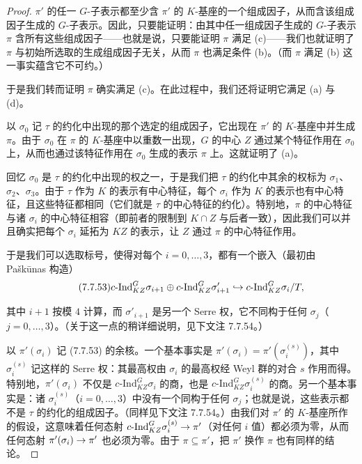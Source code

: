 \begin{proof}
$\pi'$ 的任一 $G$-子表示都至少含 $\pi'$ 的 $K$-基座的一个组成因子，从而含该组成因子生成的 $G$-子表示。因此，只要能证明：由其中任一组成因子生成的 $G$-子表示 $\pi$ 含所有这些组成因子——也就是说，只要能证明 $\pi$ 满足 (c)——我们也就证明了 $\pi$ 与初始所选取的生成组成因子无关，从而 $\pi$ 也满足条件 (b)。（而 $\pi$ 满足 (b) 这一事实蕴含它不可约。）

于是我们转而证明 $\pi$ 确实满足 (c)。在此过程中，我们还将证明它满足 (a) 与 (d)。

以 $\sigma_0$ 记 $\tau$ 的约化中出现的那个选定的组成因子，它出现在 $\pi'$ 的 $K$-基座中并生成 $\pi$。由于 $\sigma_0$ 在 $\pi$ 的 $K$-基座中以重数一出现，$G$ 的中心 $Z$ 通过某个特征作用在 $\sigma_0$ 上，从而也通过该特征作用在 $\sigma_0$ 生成的表示 $\pi$ 上。这就证明了 (a)。

回忆 $\sigma_0$ 是 $\tau$ 的约化中出现的权之一，于是我们把 $\tau$ 的约化中其余的权标为 $\sigma_1$、$\sigma_2$、$\sigma_3$。由于 $\tau$ 作为 $K$ 的表示有中心特征，每个 $\sigma_i$ 作为 $K$ 的表示也有中心特征，且这些特征都相同（它们就是 $\tau$ 的中心特征的约化）。特别地，$\pi$ 的中心特征与诸 $\sigma_i$ 的中心特征相容（即前者的限制到 $K\cap Z$ 与后者一致），因此我们可以并且确实把每个 $\sigma_i$ 延拓为 $KZ$ 的表示，让 $Z$ 通过 $\pi$ 的中心特征作用。

于是我们可以选取标号，使得对每个 $i=0,\dots,3$，都有一个嵌入（最初由 Pa\v{s}k\={u}nas 构造）
\begin{equation}\tag{7.7.53}
c\text{-}\mathrm{Ind}_{KZ}^G\sigma_{i+1}\oplus c\text{-}\mathrm{Ind}_{KZ}^G\sigma'_{i+1}\hookrightarrow c\text{-}\mathrm{Ind}_{KZ}^G\sigma_i/T,
\end{equation}

其中 $i+1$ 按模 $4$ 计算，而 $\sigma'_{i+1}$ 是另一个 Serre 权，它不同构于任何 $\sigma_j$（$j=0,\dots,3$）。（关于这一点的稍详细说明，见下文注 7.7.54。）

以 $\pi'(\sigma_i)$ 记 (7.7.53) 的余核。一个基本事实是 $\pi'(\sigma_i)=\pi'(\sigma_i^{(s)})$，其中 $\sigma_i^{(s)}$ 记这样的 Serre 权：其最高权由 $\sigma_i$ 的最高权经 Weyl 群的对合 $s$ 作用而得。特别地，$\pi'(\sigma_i)$ 不仅是 $c\text{-}\mathrm{Ind}_{KZ}^G\sigma_i$ 的商，也是 $c\text{-}\mathrm{Ind}_{KZ}^G\sigma_i^{(s)}$ 的商。另一个基本事实是：诸 $\sigma_i^{(s)}$（$i=0,\dots,3$）中没有一个同构于任何 $\sigma_j$；也就是说，这些表示都不是 $\tau$ 的约化的组成因子。（同样见下文注 7.7.54。）由我们对 $\pi'$ 的 $K$-基座所作的假设，这意味着任何态射 $c\text{-}\mathrm{Ind}_{KZ}^G\sigma_i^{(s)}\rightarrow\pi'$（对任何 $i$ 值）都必须为零，从而任何态射 $\pi'(\sigma_i)\rightarrow\pi'$ 也必须为零。由于 $\pi\subseteq\pi'$，把 $\pi'$ 换作 $\pi$ 也有同样的结论。


\end{proof}
